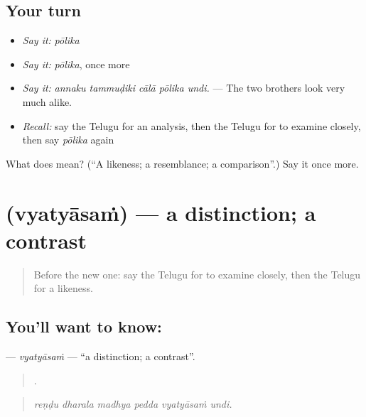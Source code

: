 \subsection*{Your turn}
\begin{itemize}
\raggedright
  \item \emph{Say it:} \emph{pōlika}
  \item \emph{Say it:} \emph{pōlika}, once more
  \item \emph{Say it:} \emph{annaku tammuḍiki cālā pōlika undi.} — The two brothers look very much alike.
  \item \emph{Recall:} say the Telugu for an analysis, then the Telugu for to examine closely, then say \emph{pōlika} again
\end{itemize}

\begin{tcolorbox}[breakable,colback=teal!4,colframe=teal!35!black,title={Before you move on}]
What does  mean? (\textquotedblleft{}A likeness; a resemblance; a comparison\textquotedblright{}.) Say it once more.
\end{tcolorbox}
\section[\texorpdfstring{\te{వ్యత్యాసం} (vyatyāsaṁ)}{వ్యత్యాసం (vyatyāsaṁ)}]{ (vyatyāsaṁ) — a distinction; a contrast}

\label{lesson:TE-C389-vyatyasam}



\begin{quote}
Before the new one: say the Telugu for to examine closely, then the Telugu for a likeness.
\end{quote}

\subsection*{You'll want to know: }
\textbf{} — \emph{vyatyāsaṁ} — \textquotedblleft{}a distinction; a contrast\textquotedblright{}.

\begin{quote}
     .
\end{quote}

\begin{quote}
\emph{reṇḍu dharala madhya pedda vyatyāsaṁ undi.}
\end{quote}

